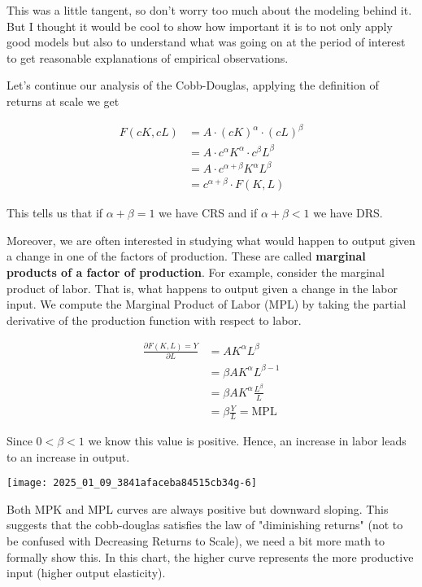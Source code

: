 \documentclass[10pt]{article}
\begin{document}
This was a little tangent, so don't worry too much about the modeling behind it. But I thought it would be cool to show how important it is to not only apply good models but also to understand what was going on at the period of interest to get reasonable explanations of empirical observations.

Let's continue our analysis of the Cobb-Douglas, applying the definition of returns at scale we get

\begin{align}
  F(c K, c L) &= A \cdot(c K)^{\alpha} \cdot(c L)^{\beta} \\
  &=A \cdot c^{\alpha} K^{\alpha} \cdot c^{\beta} L^{\beta} \\
  &=A \cdot c^{\alpha+\beta} K^{\alpha} L^{\beta} \\
  &=c^{\alpha+\beta} \cdot F(K, L)
\end{align}


This tells us that if $\alpha+\beta=1$ we have CRS and if $\alpha+\beta<1$ we have DRS.

Moreover, we are often interested in studying what would happen to output given a change in one of the factors of production. These are called \textbf{marginal products of a factor of production}. For example, consider the marginal product of labor. That is, what happens to output given a change in the labor input. We compute the Marginal Product of Labor (MPL) by taking the partial derivative of the production function with respect to labor.

\begin{align}
  \frac{\partial F(K, L)=Y}{\partial L}&=A K^{\alpha} L^{\beta} \\
  &=\beta A K^{\alpha} L^{\beta-1} \\
  &=\beta A K^{\alpha} \frac{L^{\beta}}{L} \\
  &=\beta \frac{Y}{L} = \text{MPL}
\end{align}

Since $0<\beta<1$ we know this value is positive. Hence, an increase in labor leads to an increase in output.

\texttt{[image: 2025\_01\_09\_3841afaceba84515cb34g-6]}

Both MPK and MPL curves are always positive but downward sloping. This suggests that the cobb-douglas satisfies the law of "diminishing returns" (not to be confused with Decreasing Returns to Scale), we need a bit more math to formally show this. In this chart, the higher curve represents the more productive input (higher output elasticity).
\end{document}
